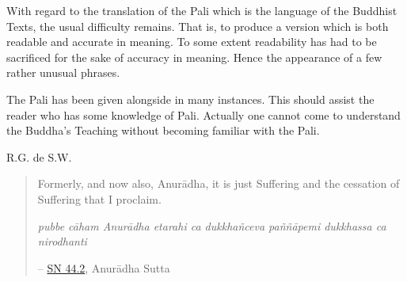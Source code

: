 With regard to the translation of the Pali which is the language of the Buddhist Texts, the usual difficulty remains. That is, to produce a version which is both readable and accurate in meaning. To some extent readability has had to be sacrificed for the sake of accuracy in meaning. Hence the appearance of a few rather unusual phrases.

The Pali has been given alongside in many instances. This should assist the reader who has some knowledge of Pali. Actually one cannot come to understand the Buddha's Teaching without becoming familiar with the Pali.

R.G. de S.W.

\begin{quote}
Formerly, and now also, Anurādha, it is just Suffering and the cessation of Suffering that I proclaim.

\emph{pubbe cāham Anurādha etarahi ca dukkhañceva paññāpemi dukkhassa ca nirodhanti}

 -- \href{https://suttacentral.net/sn44.2/en/sujato}{SN 44.2}, Anurādha Sutta
\end{quote}
